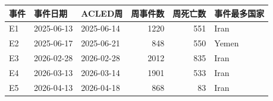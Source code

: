 \begin{tabular}{lllrrl}
\toprule
事件 & 事件日期 & ACLED周 & 周事件数 & 周死亡数 & 事件最多国家 \\
\midrule
E1 & 2025-06-13 & 2025-06-14 & 1220 & 551 & Iran \\
E2 & 2025-06-17 & 2025-06-21 & 848 & 550 & Yemen \\
E3 & 2026-02-28 & 2026-02-28 & 2012 & 835 & Iran \\
E4 & 2026-03-13 & 2026-03-14 & 1901 & 533 & Iran \\
E5 & 2026-04-13 & 2026-04-18 & 868 & 83 & Iran \\
\bottomrule
\end{tabular}
